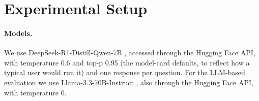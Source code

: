 \documentclass[11pt]{article}
\begin{document}
\begin{table}[t]
\centering
\small
{}
\caption{Dataset and corruption statistics over the nine corrupted conditions ($r$ $\in$ \{25, 50, 75\}\%, $\rho$ $\in$ \{10, 40, 70\}\%), first 500 questions of GSM8K and ARC-Challenge and all of MATH-500. \emph{Eligible words} are those the generator may corrupt, after protected spans, single-character words and function words are removed; the typo rate applies to them, and real-word ratios are pooled over all corrupted words.}
\label{tab:1}
\end{table}


\section{Experimental Setup}\label{sec:setup}

\paragraph{Models.} We use DeepSeek-R1-Distill-Qwen-7B \citep{guo2025}, accessed through the Hugging Face API, with temperature 0.6 and top-p 0.95 (the model-card defaults, to reflect how a typical user would run it) and one response per question. For the LLM-based evaluation we use Llama-3.3-70B-Instruct \citep{grattafiori2024}, also through the Hugging Face API, with temperature 0.
\end{document}
